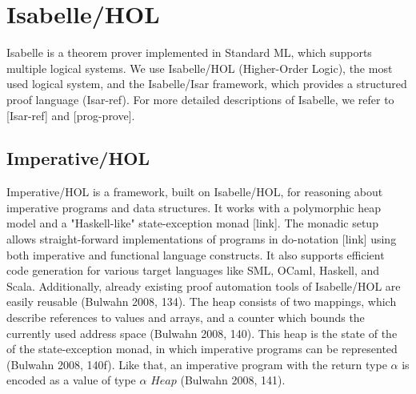 \chapter{Isabelle/HOL}\label{chapter:isabelle}

Isabelle is a theorem prover implemented in Standard ML, which supports multiple logical systems. We use Isabelle/HOL (Higher-Order Logic), the most used logical system, and the Isabelle/Isar framework, which provides a structured proof language (Isar-ref). For more detailed descriptions of Isabelle, we refer to [Isar-ref] and [prog-prove].

\section{Imperative/HOL}

Imperative/HOL is a framework, built on Isabelle/HOL, for reasoning about imperative programs and data structures. It works with a polymorphic heap model and a "Haskell-like" state-exception monad [link]. The monadic setup allows straight-forward implementations of programs in do-notation [link] using both imperative and functional language constructs. It also supports efficient code generation for various target languages like SML, OCaml, Haskell, and Scala. Additionally, already existing proof automation tools of Isabelle/HOL are easily reusable (Bulwahn 2008, 134).
The heap consists of two mappings, which describe references to values and arrays, and a counter which bounds the currently used address space (Bulwahn 2008, 140). This heap is the state of the of the state-exception monad, in which imperative programs can be represented (Bulwahn 2008, 140f). Like that, an imperative program with the return type $\alpha$ is encoded as a value of type $\alpha$ $Heap$ (Bulwahn 2008, 141).

